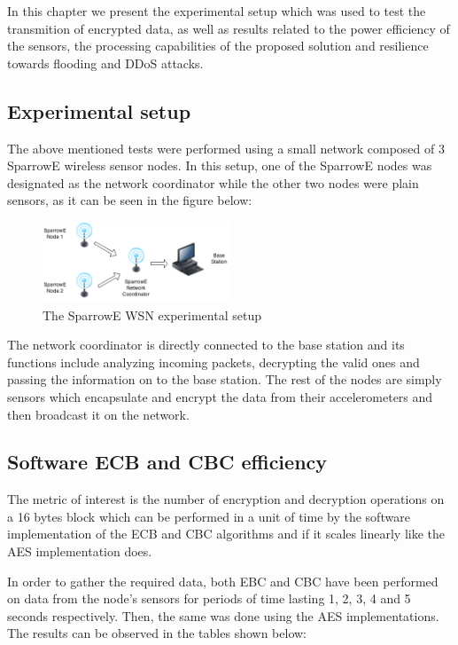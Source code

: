 In this chapter we present the experimental setup which was 
used to test the transmition of encrypted data, as well as results 
related to the power efficiency of the sensors, the processing 
capabilities of the proposed solution and resilience towards 
flooding and DDoS attacks.

\subsection{Experimental setup}

The above mentioned tests were performed using a small network 
composed of 3 SparrowE wireless sensor nodes. In this setup, 
one of the SparrowE nodes was designated as the network coordinator 
while the other two nodes were plain sensors, as it can be seen in 
the figure below:

\begin{figure}[ht] \centering
  \includegraphics[width=0.5\textwidth]{img/experimental-setup.png}
  \caption{The SparrowE WSN experimental setup}
\end{figure}

The network coordinator is directly connected to the base station and 
its functions include analyzing incoming packets, decrypting the valid 
ones and passing the information on to the base station. The rest of the 
nodes are simply sensors which encapsulate and encrypt the data from their 
accelerometers and then broadcast it on the network.

\subsection{Software ECB and CBC efficiency}

The metric of interest is the number of encryption and decryption operations 
on a 16 bytes block which can be performed in a unit of time by the software 
implementation of the ECB and CBC algorithms and if it scales linearly like 
the AES implementation does.

In order to gather the required data, both EBC and CBC have been performed on 
data from the node's sensors for periods of time lasting 1, 2, 3, 4 and 5 seconds 
respectively. Then, the same was done using the AES implementations. The results 
can be observed in the tables shown below:\\

